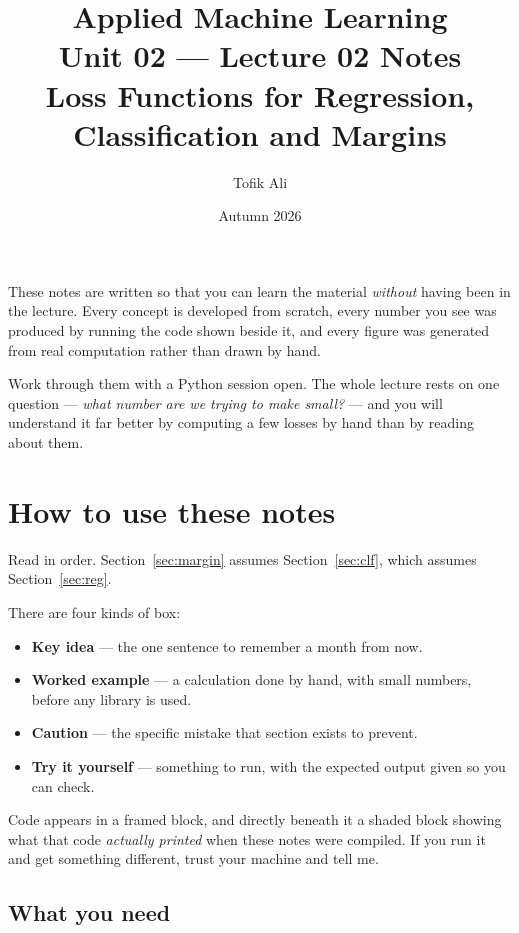 \documentclass[11pt]{article}
\title{Applied Machine Learning\\Unit 02 --- Lecture 02 Notes\\
       Loss Functions for Regression, Classification and Margins}
\author{Tofik Ali}
\date{Autumn 2026}
\begin{document}
\maketitle

\begin{keyidea}
These notes are written so that you can learn the material \emph{without}
having been in the lecture. Every concept is developed from scratch, every
number you see was produced by running the code shown beside it, and every
figure was generated from real computation rather than drawn by hand.

Work through them with a Python session open. The whole lecture rests on one
question --- \emph{what number are we trying to make small?} --- and you will
understand it far better by computing a few losses by hand than by reading
about them.
\end{keyidea}

\tableofcontents
\newpage

\section{How to use these notes}
\label{sec:how}

Read in order. Section~\ref{sec:margin} assumes Section~\ref{sec:clf}, which
assumes Section~\ref{sec:reg}.

There are four kinds of box:

\begin{itemize}[leftmargin=*]
  \item \textbf{Key idea} --- the one sentence to remember a month from now.
  \item \textbf{Worked example} --- a calculation done by hand, with small
    numbers, before any library is used.
  \item \textbf{Caution} --- the specific mistake that section exists to prevent.
  \item \textbf{Try it yourself} --- something to run, with the expected output
    given so you can check.
\end{itemize}

Code appears in a framed block, and directly beneath it a shaded block showing
what that code \emph{actually printed} when these notes were compiled. If you
run it and get something different, trust your machine and tell me.

\subsection{What you need}
\end{document}
